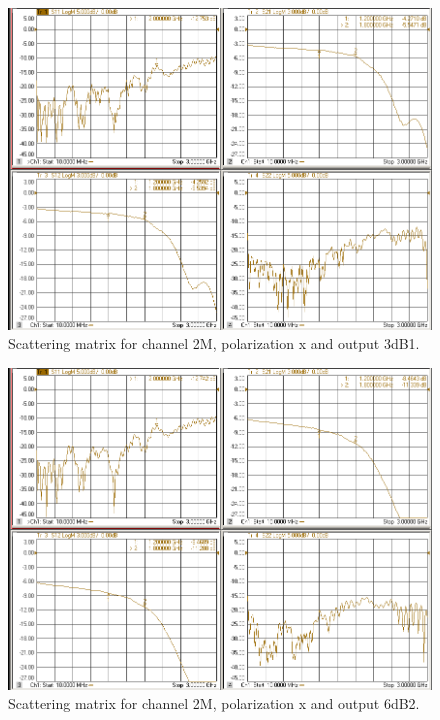 \documentclass[12pt,a4paper,oneside]{article}
\begin{document}
\begin{figure}[H]
\centering
\includegraphics[width=0.9\linewidth]{VNA_results/2Mx_3dB1.png}
\caption{Scattering matrix for channel 2M, polarization x and output 3dB1.}
\label{fig:2Mx_3dB1}
\end{figure}


\begin{figure}[H]
\centering
\includegraphics[width=0.9\linewidth]{VNA_results/2Mx_6dB2.png}
\caption{Scattering matrix for channel 2M, polarization x and output 6dB2.}
\label{fig:2Mx_6dB2}
\end{figure}
\end{document}
